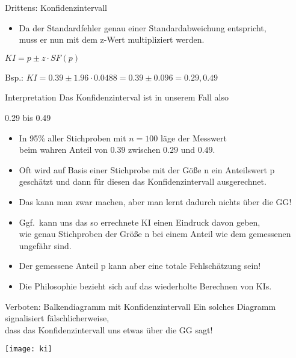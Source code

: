 \begin{frame}
  {Drittens: Konfidenzintervall}
  \begin{itemize}[<+->]
    \item Da \alert{der Standardfehler genau einer Standardabweichung entspricht},\\
      muss er nun \alert{mit dem z-Wert multipliziert} werden.
  \end{itemize}
  \pause
  \vspace{.5cm}
  \begin{center}
    \alert{$KI=p\pm z\cdot SF(p)$}

    \vspace{.2cm}
    Bsp.: $KI=0.39\pm1.96\cdot 0.0488=0.39\pm0.096=0.29, 0.49$
  \end{center}
\end{frame}

\begin{frame}
  {Interpretation}
  Das \alert{Konfidenzinterval} ist in unserem Fall also\\
  \vspace{.1cm}
  \begin{center}
    \alert{0.29 bis 0.49}  
  \end{center}
  \pause
  \begin{itemize}[<+->]
    \item In 95\% aller Stichproben mit $n=100$ läge der Messwert\\
      beim wahren Anteil von $0.39$ zwischen $0.29$ und $0.49$.
    \item Oft wird auf Basis einer Stichprobe mit der Göße n ein Anteilswert p\\
      geschätzt und dann für diesen das Konfidenzintervall ausgerechnet.
    \item Das kann man zwar machen, aber man lernt dadurch nichts über die GG!
    \item Ggf.\ kann uns das so errechnete KI einen Eindruck davon geben,\\
      wie genau Stichproben der Größe n bei einem Anteil wie dem gemessenen\\
      ungefähr sind.
      \vspace{\baselineskip}
    \item \alert{Der gemessene Anteil p kann aber eine totale Fehlschätzung sein!}
    \item Die Philosophie bezieht sich auf das \alert{wiederholte Berechnen} von KIs.
  \end{itemize}
\end{frame}

\begin{frame}
  {Verboten: Balkendiagramm mit Konfidenzintervall}
  Ein solches Diagramm signalisiert \alert{fälschlicherweise},\\
  dass das Konfidenzintervall uns etwas über die GG sagt!\\
  \vspace{-1cm}
  \begin{center}
    \texttt{[image: ki]}
  \end{center}
\end{frame}

